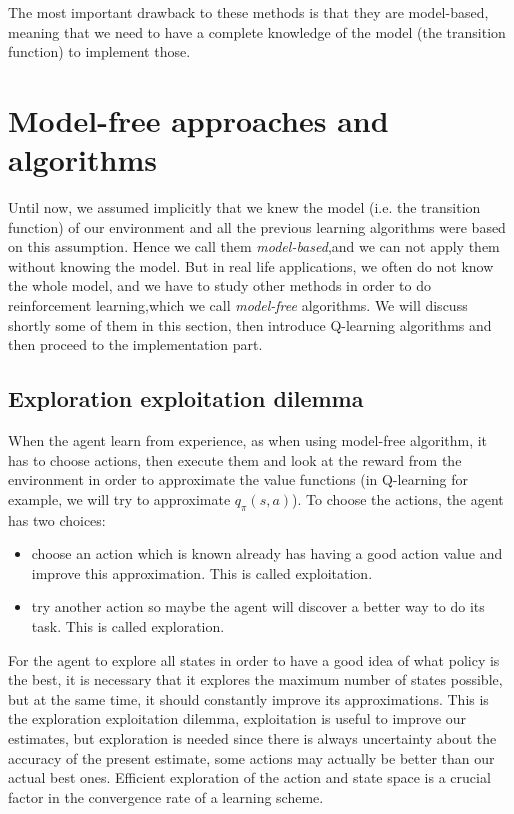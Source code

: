 \documentclass[14pt,a4paper]{article}
\theoremstyle{definition}
\begin{document}
The most important drawback to these methods is that they are model-based, meaning that we need to have a complete knowledge of the model (the transition function) to implement those.

\section{Model-free approaches and algorithms}

Until now, we assumed implicitly that we knew the model (i.e. the transition function) of our environment and all the previous learning algorithms were based on this assumption. Hence we call them \emph{model-based},and we can not apply them without knowing the model. But in real life applications, we often do not know the whole model, and we have to study other methods in order to do reinforcement learning,which we call \emph{model-free} algorithms. We will discuss shortly some of them in this section, then introduce Q-learning algorithms and then proceed to the implementation part.


\subsection{Exploration exploitation dilemma}

When the agent learn from experience, as when using model-free algorithm, it has to choose actions, then execute them and look at the reward from the environment in order to approximate the value functions (in Q-learning for example, we will try to approximate $q_\pi(s,a)$). To choose the actions, the agent has two choices:
\begin{itemize}
\item choose an action which is known already has having a good action value and improve this approximation. This is called exploitation.
\item try another action so maybe the agent will discover a better way to do its task. This is called exploration. 
\end{itemize}

For the agent to explore all states in order to have a good idea of what policy is the best, it is necessary that it explores the maximum number of states possible, but at the same time, it should constantly improve its approximations. This is the exploration exploitation dilemma, exploitation is useful to improve our estimates, but exploration is needed since there is always uncertainty about the accuracy of the present estimate, some actions may actually be better than our actual best ones. Efficient exploration of the action and state space is a crucial factor in the convergence rate of a learning scheme.
\end{document}

